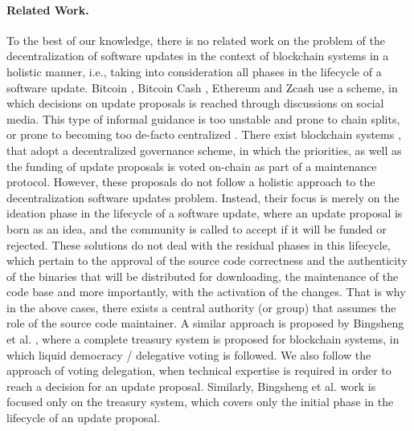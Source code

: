 \paragraph{Related Work.}
To the best of our knowledge, there is no related work on the problem of the decentralization of software updates in the context of blockchain systems in a holistic manner, i.e., taking into consideration all phases in the lifecycle of a software update.
Bitcoin \cite{bitcoin}, Bitcoin Cash \cite{bitcoincash}, Ethereum \cite{ethereum} and Zcash \cite{zerocash} use a  scheme, in which decisions on update proposals is reached through discussions on social media. This type of informal guidance is  too unstable and prone to chain splits, or prone to becoming too de-facto centralized \cite{buterin_on_gov}. There exist blockchain systems \cite{dash}, \cite{decred} that adopt a decentralized governance scheme, in which the priorities, as well as the funding of update proposals is voted on-chain as part of a maintenance protocol. However, these proposals do not follow a holistic approach to the decentralization software updates problem. Instead, their focus is merely on the ideation phase in the lifecycle of a software update, where an update proposal is born as an idea, and the community is called to accept if it will be funded or rejected. These solutions do not deal with the residual phases in this lifecycle, which pertain to the approval of the source code correctness and the authenticity of the binaries that will be distributed for downloading, the maintenance of the code base and more importantly, with the activation of the changes. That is why in the above cases, there exists a central authority (or group) that assumes the role of the source code maintainer. A similar approach is proposed by Bingsheng et al. \cite{treasury}, where a complete treasury system is proposed for blockchain systems, in which liquid democracy / delegative voting is followed. We also follow the approach of voting delegation, when technical expertise is required in order to reach a decision for an update proposal. Similarly, Bingsheng et al. work is focused only on the treasury system, which covers only the initial phase in the lifecycle of an update proposal.


%
